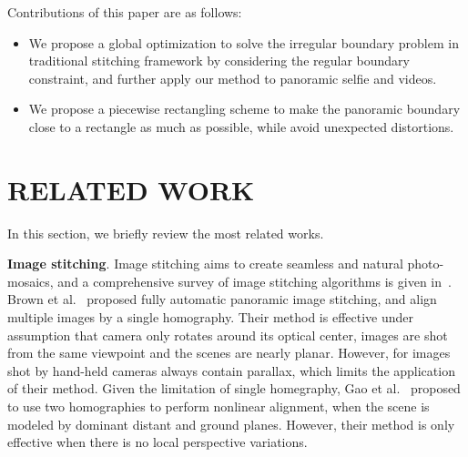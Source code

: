 \documentclass[10pt,journal,compsoc]{IEEEtran}
\begin{document}
Contributions of this paper are as follows:
\begin{itemize}
   \item We propose a global optimization to solve the irregular boundary problem in traditional stitching framework by considering the regular boundary constraint, and further apply our method to panoramic selfie and videos.
   \item We propose a piecewise rectangling scheme to make the panoramic boundary close to a rectangle as much as possible, while avoid unexpected distortions.
\end{itemize}

 \section{RELATED WORK}
In this section, we briefly review the most related works.

\textbf{Image stitching}.
Image stitching aims to create seamless and natural photo-mosaics, and a comprehensive survey of image stitching algorithms is given in~\cite{journals/ftcgv/Szeliski06}.
Brown et al.~\cite{journals/ijcv/BrownL07} proposed fully automatic panoramic image stitching, and align multiple images by a single homography. Their method is effective under assumption that camera only rotates around its optical center, images are shot from the same viewpoint and the scenes are nearly planar. However, for images shot by hand-held cameras always contain parallax, which limits the application of their method.
Given the limitation of single homegraphy, Gao et al.~\cite{conf/CVPR/GaoKB11} proposed to use two homographies to perform nonlinear alignment, when the scene is modeled by dominant distant and ground planes. However, their method is only effective when there is no local perspective variations.
\end{document}
